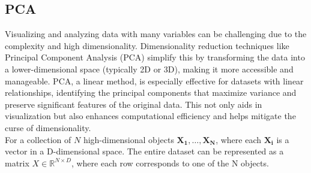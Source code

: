 \documentclass{article}\usepackage[]{graphicx}\usepackage[]{xcolor}
\numberwithin{equation}{section}
\begin{document}
{\subsection{PCA}

Visualizing and analyzing data with many variables can be challenging due to the complexity and high dimensionality. Dimensionality reduction techniques like Principal Component Analysis (PCA) simplify this by transforming the data into a lower-dimensional space (typically 2D or 3D), making it more accessible and manageable. PCA, a linear method, is especially effective for datasets with linear relationships, identifying the principal components that maximize variance and preserve significant features of the original data. This not only aids in visualization but also enhances computational efficiency and helps mitigate the curse of dimensionality.\\

\noindent
For a collection of $N$ high-dimensional objects $\mathbf{X_1},\dots,\mathbf{X_N}$, where each $\mathbf{X_i}$ is a vector in a D-dimensional space. The entire dataset can be represented as a matrix $X \in \mathbb{R}^{N \times D}$, where each row corresponds to one of the N objects.\\

}
\end{document}
